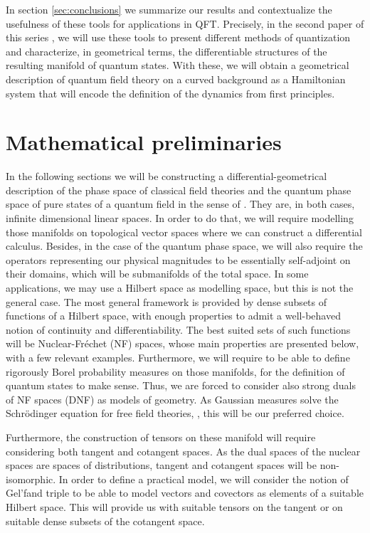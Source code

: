 \documentclass{elsarticle}%
\begin{document}
In section \ref{sec:conclusions} we summarize our results and contextualize the usefulness of  these  tools for applications in QFT. Precisely, in the second paper of this series \cite{alonsoGeometricFlavours2024}, we will use these tools to present different methods of quantization and characterize, in geometrical terms, the differentiable structures of the resulting manifold of quantum states. With these, we will obtain a geometrical description of quantum field theory on a curved background as a Hamiltonian system that will encode the definition of the dynamics from first principles.

\section{Mathematical preliminaries}
\label{sec:math_preliminaries}
In the following sections we will be constructing a differential-geometrical description of the phase space of classical field theories  and the quantum phase space of pure states of a quantum field in the sense of \cite{kibbleGeometrizationQuantum1979}. They are, in both cases, infinite dimensional linear spaces. In order to do that, we will require modelling those manifolds on topological vector spaces where we can construct a differential calculus. Besides, in the case of the quantum phase space, we will also require the operators representing our physical magnitudes to be essentially self-adjoint on their domains, which will be submanifolds of the total space.  In some  applications, we may use a Hilbert space as modelling space, but this is not the general case. The most general framework is provided by dense subsets of functions of a Hilbert space, with enough properties to admit a well-behaved notion of continuity and differentiability. The best suited sets of such functions will be Nuclear-Fréchet (NF) spaces, whose main properties are presented below, with a few relevant examples. Furthermore, we will require to be able to define rigorously Borel probability measures on those manifolds, for the definition of quantum states to make sense. Thus, we are forced to consider also strong duals of NF spaces (DNF) as models of geometry. As Gaussian measures solve the Schrödinger equation for free field theories, \cite{ longSchrodingerWave1998, hofmannNonGaussianGroundstate2017, hofmannClassicalQuantum2015}, this will be our preferred choice. 

Furthermore, the construction of tensors on these manifold will require considering both tangent and cotangent spaces. As the dual spaces of the nuclear spaces are spaces of distributions, tangent and cotangent spaces will be  non-isomorphic. In order to define a practical model, we will consider the notion of Gel'fand triple to be able to model vectors and covectors as elements of a suitable Hilbert space. This will provide us with suitable tensors on the tangent or on suitable dense subsets of the cotangent space. 
\end{document}
